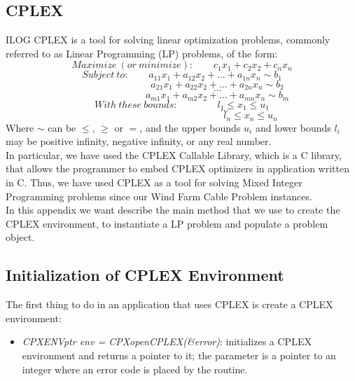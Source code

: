 
\begin{appendices}
\chapter{CPLEX}
ILOG CPLEX is a tool for solving linear optimization problems, commonly referred to as Linear Programming (LP) problems, of the form:
\[
Maximize \ (or \ minimize): \quad \quad c_1 x_1 + c_2 x_2 + c_n x_n 
\]
\[
Subject \ to: \quad \quad a_{11} x_1 + a_{12} x_2 + ... + a_{1n} x_n \sim b_1 
\]
\[
\qquad \qquad \qquad \quad \ a_{21} x_1 + a_{22} x_2 + ... + a_{2n} x_n \sim b_2
\]
\[
\qquad \qquad \qquad \quad \ ...
\]
\[
\qquad \qquad \qquad \quad \ a_{m1} x_1 + a_{m2} x_2 + ... + a_{mn} x_n \sim b_m
\]
\[
With \ these \ bounds: \qquad \qquad l_1 \leq x_1 \leq u_1
\]
\[
\qquad \qquad \qquad \qquad \ \ \  ...
\]
\[
\qquad \qquad \qquad \qquad \qquad \qquad \qquad l_n \leq x_n \leq u_n
\]
Where $\sim$ can be $\leq$, $\geq$ or $=$, and the upper bounds $u_i$ and lower bounds $l_i$ may be positive infinity, negative infinity, or any real number.\\
In particular, we have used the \textsc{CPLEX} Callable Library, which is a C library, that allows the programmer to embed \textsc{CPLEX} optimizers in application written in C. Thus, we have used \textsc{CPLEX} as a tool for solving Mixed Integer Programming problems since our Wind Farm Cable Problem instances.\\
In this appendix we want describe the main method that we use to create the \textsc{CPLEX} environment, to instantiate a LP problem and populate a problem object.

\section{Initialization of \textsc{CPLEX} Environment}
The first thing to do in an application that uses \textsc{CPLEX} is create a \textsc{CPLEX} environment:
\begin{itemize}
\item \textit{CPXENVptr env = CPXopenCPLEX(\&error)}: initializes a \textsc{CPLEX} environment and returns a pointer to it; the parameter is a pointer to an integer where an error code is placed by the routine.
\end{itemize}


\end{appendices}
